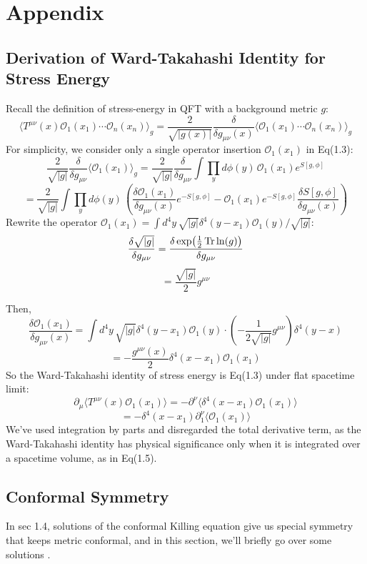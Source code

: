 \documentclass[12pt]{article}
\numberwithin{equation}{section}
\newcommand\<\langle
\renewcommand\>\rangle
\renewcommand\.{\cdot}
\begin{document}
\section*{Appendix}
\subsection*{Derivation of Ward-Takahashi Identity for Stress Energy}
Recall the definition of stress-energy in QFT with a background metric $g$:
\begin{equation*}
    \langle T^{\mu\nu}(x)\mathcal{O}_1(x_1)\cdots\mathcal{O}_n(x_n)\rangle_g = \frac{2}{\sqrt{|g(x)|}}\frac{\delta}{\delta g_{\mu\nu}(x)}\langle\mathcal{O}_1(x_1)\cdots\mathcal{O}_n(x_n)\rangle_{g}
\end{equation*}
For simplicity, we consider only a single operator insertion $\mathcal{O}_1(x_1)$ in Eq(1.3):
\[
    \frac{2}{\sqrt{|g|}}\frac{\delta}{\delta g_{\mu\nu}}\langle\mathcal{O}_1(x_1)\rangle_g = \frac{2}{\sqrt{|g|}}\frac{\delta}{\delta g_{\mu\nu}}\int{\prod_{y}d\phi(y)\,}\mathcal{O}_1(x_1)e^{S[g,\phi]}
\]
\[
    = \frac{2}{\sqrt{|g|}}\int{\prod_{y}d\phi(y)\,}\left(\frac{\delta\mathcal{O}_1(x_1)}{\delta g_{\mu\nu}(x)}e^{-S[g,\phi]} - \mathcal{O}_1(x_1)e^{-S[g,\phi]}\frac{\delta S[g,\phi]}{\delta g_{\mu\nu}(x)}\right)
\]
Rewrite the operator $\mathcal{O}_1(x_1) = \int{d^4y\,} \sqrt{|g|}\delta^4(y-x_1)\mathcal{O}_1(y)/\sqrt{|g|}$:
\[
    \frac{\delta\sqrt{|g|}}{\delta g_{\mu\nu}} = \frac{\delta\exp(\frac{1}{2}\Tr\ln(g))}{\delta g_{\mu\nu}}
\]
\[
    =\frac{\sqrt{|g|}}{2}g^{\mu\nu}
\]

Then,
\[
    \frac{\delta\mathcal{O}_1(x_1)}{\delta g_{\mu\nu}(x)} = \int{d^4y\,\sqrt{|g|}}\delta^4(y-x_1)\mathcal{O}_1(y)\cdot(-\frac{1}{2\sqrt{|g|}}g^{\mu\nu})\delta^4(y-x)
\]
\[
    = -\frac{g^{\mu\nu}(x)}{2}\delta^4(x-x_1)\mathcal{O}_1(x_1)
\]
So the Ward-Takahashi identity of stress energy is Eq(1.3) under flat spacetime limit:
\[
     \partial_{\mu}\langle T^{\mu\nu}(x)\mathcal{O}_1(x_1)\rangle = -\partial^{\nu}\langle\delta^4(x-x_1)\mathcal{O}_1(x_1)\rangle
\]
\[
    = -\delta^4(x-x_1)\partial^{\nu}_{1}\langle\mathcal{O}_1(x_1)\rangle
\]
We've used integration by parts and disregarded the total derivative term, as the Ward-Takahashi identity has physical significance only when it is integrated over a spacetime volume, as in Eq(1.5).
\subsection*{Conformal Symmetry}
In sec 1.4, solutions of the conformal Killing equation give us special symmetry that keeps metric conformal, and in this section, we'll briefly go over some solutions \cite{DiFrancesco:1997nk}.
\end{document}
